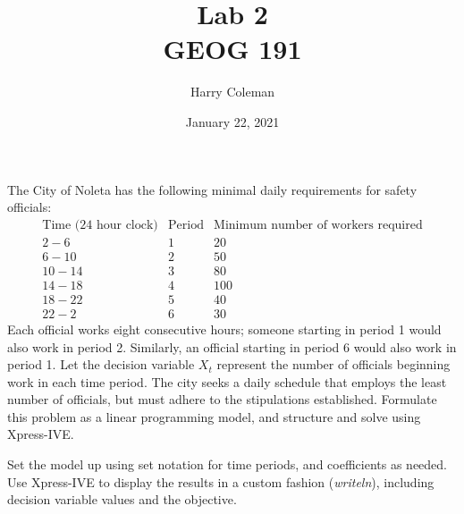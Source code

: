\documentclass[12pt]{article}
\title{Lab 2\\
    \large GEOG 191
}
\author{Harry Coleman}
\date{January 22, 2021}
\newenvironment{problem}
    {\begin{lrbox}{\mybox}\begin{minipage}{0.98\textwidth}}
    {\end{minipage}\end{lrbox}\begin{center}\framebox[\textwidth]{\usebox{\mybox}}\end{center}}
\theoremstyle{definition}
\begin{document}
\maketitle

\begin{problem}
    The City of Noleta has the following minimal daily requirements for safety officials:
    \[
        \begin{array}{c|c|c}
            \text{Time (24 hour clock)} & \text{Period} & \text{Minimum number of workers required} \\\hline\hline
            2-6 & 1 & 20 \\\hline
            6-10 & 2 & 50 \\\hline
            10-14 & 3 & 80 \\\hline
            14-18 & 4 & 100 \\\hline
            18-22 & 5 & 40 \\\hline
            22-2 & 6 & 30
        \end{array}
    \]
    Each official works eight consecutive hours; someone starting in period 1 would also work in period 2. Similarly, an official starting in period 6 would also work in period 1. Let the decision variable $X_t$ represent the number of officials beginning work in each time period. The city seeks a daily schedule that employs the least number of officials, but must adhere to the stipulations established. Formulate this problem as a linear programming model, and structure and solve using Xpress-IVE.
    
    Set the model up using set notation for time periods, and coefficients as needed. Use Xpress-IVE to display the results in a custom fashion (\textit{writeln}), including decision variable values and the objective.
\end{problem}

\newpage
\end{document}
